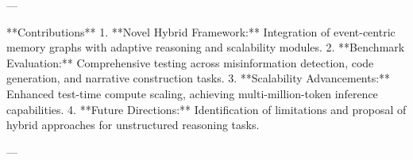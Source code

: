 ---

**Contributions**  
1. **Novel Hybrid Framework:** Integration of event-centric memory graphs with adaptive reasoning and scalability modules.  
2. **Benchmark Evaluation:** Comprehensive testing across misinformation detection, code generation, and narrative construction tasks.  
3. **Scalability Advancements:** Enhanced test-time compute scaling, achieving multi-million-token inference capabilities.  
4. **Future Directions:** Identification of limitations and proposal of hybrid approaches for unstructured reasoning tasks.

--- 

